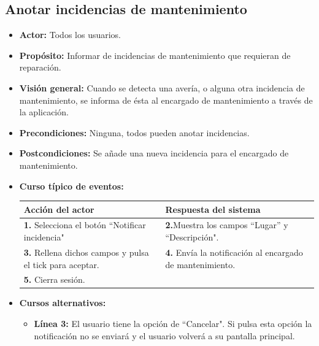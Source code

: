 \documentclass[spanish,a4paper,11pt, twoside]{report}	%
\begin{document}

		\subsection{Anotar incidencias de mantenimiento}	
			\begin{itemize}
				\item \textbf{Actor:} Todos los usuarios.
				\item \textbf{Propósito:} Informar de incidencias de mantenimiento que requieran de reparación. 		
				\item \textbf{Visión general:} Cuando se detecta una avería, o alguna otra incidencia de mantenimiento, se informa de ésta al encargado de mantenimiento a través de la aplicación.
				\item \textbf{Precondiciones:} Ninguna, todos pueden anotar incidencias.
				\item \textbf{Postcondiciones:}  Se añade una nueva incidencia para el encargado de mantenimiento.
				\item \textbf{Curso típico de eventos:}\\ 
				\begin{tabular}{|p{6cm}||p{6cm}|}
					\hline
					\textbf{Acción del actor} & \textbf{Respuesta del sistema} \\ \hline \hline
					\textbf{1.} Selecciona el botón “Notificar incidencia" & \textbf{2.}Muestra los campos “Lugar'' y “Descripción".\\ \hline 
					\textbf{3.} Rellena dichos campos y pulsa el tick para aceptar. & \textbf{4.} Envía la notificación al encargado de mantenimiento.\\ \hline
					\textbf{5.} Cierra sesión. & \\ \hline

				\end{tabular}
				\item \textbf{Cursos alternativos:} 
					\begin{itemize}
						\item \textbf{Línea 3: }El usuario tiene la opción de “Cancelar". Si pulsa esta opción la notificación no se enviará y el usuario volverá a su pantalla principal.
					\end{itemize}
			\end {itemize}

		\hspace{0.5 true cm}
\end{document}
